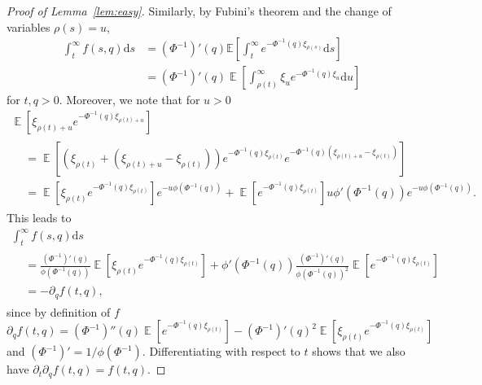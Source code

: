 \documentclass[10pt]{amsart}
\theoremstyle{definition}
\numberwithin{equation}{section}
\newcommand{\bbE}{\mathbb{E}}
\DeclareMathOperator{\E}{\mathbb{E}}
\newcommand{\dd}{\mathrm{d}}
\begin{document}
\begin{proof}[Proof of Lemma~\ref{lem:easy}]
Similarly, by Fubini's theorem and the change of variables $\rho(s)=u$,
\begin{align*}
\int_t^\infty f(s,q) \dd s &= (\Phi^{-1})'(q)\bbE\left[\int_t^\infty e^{-\Phi^{-1}(q) \xi_{\rho(s)}} \dd s\right]\\
&= (\Phi^{-1})'(q) \E\left[\int_{\rho(t)}^{\infty} \xi_u e^{-\Phi^{-1}(q) \xi_u} \dd u \right]
\end{align*}
for $t,q>0$. Moreover, we note that for $u> 0$
\begin{multline*}
\E\left[\xi_{\rho(t)+u} e^{-\Phi^{-1}(q) \xi_{\rho(t)+u}}\right]\\
\begin{aligned}
&= \E\left[\left(\xi_{\rho(t)} +\left(\xi_{\rho(t) + u} - \xi_{\rho(t)}\right)\right) e^{-\Phi^{-1}(q) \xi_{\rho(t)}} e^{-\Phi^{-1}(q) \left(\xi_{\rho(t) + u} - \xi_{\rho(t)}\right)} \right]\\
&= \E\left[\xi_{\rho(t)} e^{-\Phi^{-1}(q)\xi_{\rho(t)}} \right] e^{-u \phi\left(\Phi^{-1}(q)\right)} + \E\left[e^{-\Phi^{-1}(q) \xi_{\rho(t)}}\right] u \phi'\left(\Phi^{-1}(q)\right) e^{-u \phi(\Phi^{-1}(q))}.
\end{aligned}
\end{multline*}
This leads to
\begin{multline*}
\int_t^\infty f(s,q) \dd s\\
\begin{aligned}
&= \frac{\left(\Phi^{-1}\right)'(q)}{\phi\left(\Phi^{-1}(q)\right)} \E\left[\xi_{\rho(t)} e^{-\Phi^{-1}(q)\xi_{\rho(t)}} \right] + \phi'\left(\Phi^{-1}(q)\right) \frac{\left(\Phi^{-1}\right)'(q)}{\phi\left(\Phi^{-1}(q)\right)^2} \E\left[e^{-\Phi^{-1}(q) \xi_{\rho(t)}} \right]\\
&= -\partial_q f(t,q),
\end{aligned}
\end{multline*}
since by definition of $f$
\[
\partial_q f(t,q) = (\Phi^{-1})''(q)\E\left[e^{-\Phi^{-1}(q) \xi_{\rho(t)}}\right] - (\Phi^{-1})'(q)^2 \E\left[\xi_{\rho(t)} e^{-\Phi^{-1}(q)\xi_{\rho(t)}} \right]
\]
and $(\Phi^{-1})' = 1/\phi (\Phi^{-1})$. Differentiating with respect to $t$ shows that we also have $\partial_t \partial_q f(t,q) = f(t,q)$.


\end{proof}
\end{document}
